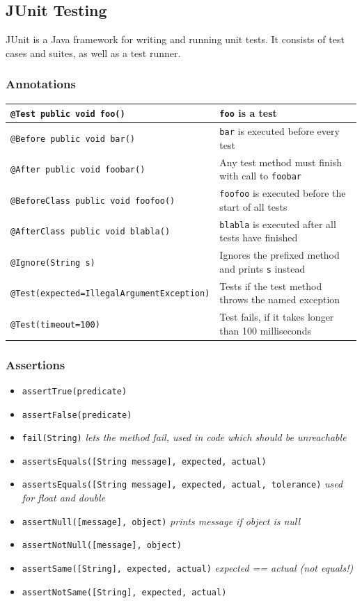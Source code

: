 \subsection{JUnit Testing}
JUnit is a Java framework for writing and running unit tests. It consists of test cases and suites, as well as a test runner.

\subsubsection*{Annotations}
\renewcommand{\arraystretch}{1.4}
\begin{tabular}{ll}
	\texttt{@Test public void foo()} & \texttt{foo} is a test \\ \hline
	\texttt{@Before public void bar()} & \texttt{bar} is executed before every test \\ \hline
	\texttt{@After public void foobar()} & Any test method must finish with call to \texttt{foobar} \\ \hline
	\texttt{@BeforeClass public void foofoo()} & \texttt{foofoo} is executed before the start of all tests \\ \hline
	\texttt{@AfterClass public void blabla()} & \texttt{blabla} is executed after all tests have finished \\ \hline
	\texttt{@Ignore(String s)} & Ignores the prefixed method and prints \texttt{s} instead \\ \hline
	\texttt{@Test(expected=IllegalArgumentException)} & Tests if the test method throws the named exception \\ \hline
	\texttt{@Test(timeout=100)} & Test fails, if it takes longer than 100 milliseconds
\end{tabular}
\renewcommand{\arraystretch}{1}

\subsubsection*{Assertions}
\begin{itemize}[]
  \item \texttt{assertTrue(predicate)}
  \item \texttt{assertFalse(predicate)}
  \item \texttt{fail(String)} \textit{lets the method fail, used in code which should be unreachable}
  \item \texttt{assertsEquals([String message], expected, actual)}
  \item \texttt{assertsEquals([String message], expected, actual, tolerance)} \textit{used for float and double}
  \item \texttt{assertNull([message], object)} \textit{prints message if object is null}
  \item \texttt{assertNotNull([message], object)}
  \item \texttt{assertSame([String], expected, actual)} \textit{expected == actual (not equals!)}
  \item \texttt{assertNotSame([String], expected, actual)}
\end{itemize}
\newpage


